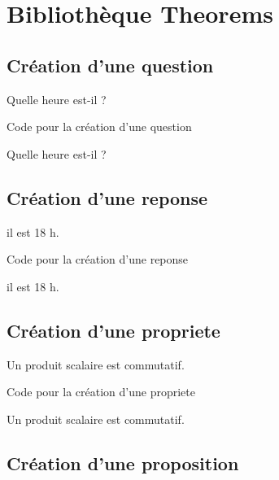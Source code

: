 \chapter {Bibliothèque Theorems}


\section{Création d'une question}

\begin{question}
    Quelle heure est-il ?
\end{question}

\begin{Latex}{Code pour la création d'une question}
\begin{question}
    Quelle heure est-il ?
\end{question}
\end{Latex}

\section{Création d'une reponse}

\begin{reponse}
    il est 18 h.
\end{reponse}

\begin{Latex}{Code pour la création d'une reponse}
\begin{reponse}
    il est 18 h.
\end{reponse}
\end{Latex}

\section{Création d'une propriete}

\begin{propriete}
    Un produit scalaire est commutatif.
\end{propriete}

\begin{Latex}{Code pour la création d'une propriete}
\begin{propriete}
    Un produit scalaire est commutatif.
\end{propriete}
\end{Latex}

\section{Création d'une proposition}

